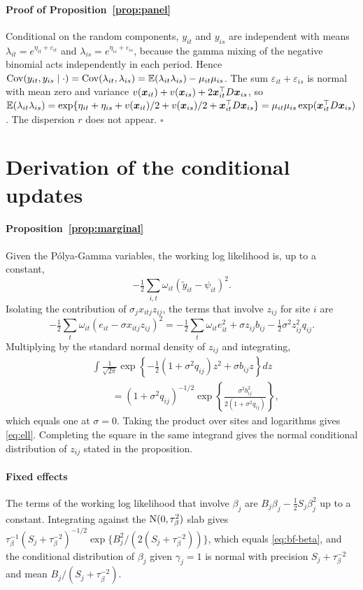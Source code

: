 \paragraph{Proof of Proposition~\ref{prop:panel}}
Conditional on the random components, $y_{it}$ and $y_{is}$ are independent with means $\lambda_{it}=e^{\eta_{it}+\varepsilon_{it}}$ and $\lambda_{is}=e^{\eta_{is}+\varepsilon_{is}}$, because the gamma mixing of the negative binomial acts independently in each period. Hence $\operatorname{Cov}(y_{it},y_{is}\mid\cdot)=\operatorname{Cov}(\lambda_{it},\lambda_{is})=\mathbb{E}(\lambda_{it}\lambda_{is})-\mu_{it}\mu_{is}$. The sum $\varepsilon_{it}+\varepsilon_{is}$ is normal with mean zero and variance $v(\bm{x}_{it})+v(\bm{x}_{is})+2\bm{x}_{it}^\top D\bm{x}_{is}$, so $\mathbb{E}(\lambda_{it}\lambda_{is})=\exp\{\eta_{it}+\eta_{is}+v(\bm{x}_{it})/2+v(\bm{x}_{is})/2+\bm{x}_{it}^\top D\bm{x}_{is}\}=\mu_{it}\mu_{is}\exp(\bm{x}_{it}^\top D\bm{x}_{is})$. The dispersion $r$ does not appear. \hfill$\square$

\section{Derivation of the conditional updates}\label{app:derivations}

\paragraph{Proposition~\ref{prop:marginal}}
Given the P\'olya-Gamma variables, the working log likelihood is, up to a constant,
\[
-\tfrac12\textstyle\sum_{i,t}\omega_{it}(\tilde y_{it}-\psi_{it})^2.
\] Isolating the contribution of $\sigma_jx_{itj}z_{ij}$, the terms that involve $z_{ij}$ for site $i$ are
\[
-\tfrac12\sum_{t}\omega_{it}\left(e_{it}-\sigma x_{itj}z_{ij}\right)^2
=-\tfrac12\sum_t\omega_{it}e_{it}^2+\sigma z_{ij}b_{ij}-\tfrac12\sigma^2z_{ij}^2q_{ij}.
\]
Multiplying by the standard normal density of $z_{ij}$ and integrating,
\begin{align*}
&\int\frac{1}{\sqrt{2\pi}}\exp\left\{-\tfrac12\left(1+\sigma^2q_{ij}\right)z^2+\sigma b_{ij}z\right\}dz\\
&\qquad=\left(1+\sigma^2q_{ij}\right)^{-1/2}\exp\left\{\frac{\sigma^2b_{ij}^2}{2\left(1+\sigma^2q_{ij}\right)}\right\},
\end{align*}
which equals one at $\sigma=0$. Taking the product over sites and logarithms gives \eqref{eq:ell}. Completing the square in the same integrand gives the normal conditional distribution of $z_{ij}$ stated in the proposition.

\paragraph{Fixed effects}
The terms of the working log likelihood that involve $\beta_j$ are $B_j\beta_j-\frac12S_j\beta_j^2$ up to a constant. Integrating against the $\mathrm{N}(0,\tau_\beta^2)$ slab gives
$\tau_\beta^{-1}(S_j+\tau_\beta^{-2})^{-1/2}\exp\{B_j^2/(2(S_j+\tau_\beta^{-2}))\}$, which equals \eqref{eq:bf-beta}, and the conditional distribution of $\beta_j$ given $\gamma_j=1$ is normal with precision $S_j+\tau_\beta^{-2}$ and mean $B_j/(S_j+\tau_\beta^{-2})$.

